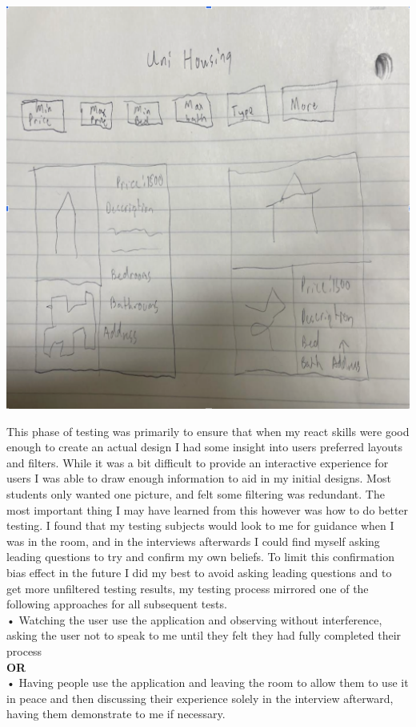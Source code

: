 \documentclass[10pt,twocolumn]{article}
\begin{document}
\centerline{\includegraphics[scale=.35]{Early User Test.png}}

This phase of testing was primarily to ensure that when my react skills were good enough to create an actual design I had some insight into users preferred layouts and filters. While it was a bit difficult to provide an interactive experience for users I was able to draw enough information to aid in my initial designs. Most students only wanted one picture, and felt some filtering was redundant. The most important thing I may have learned from this however was how to do better testing. I found that my testing subjects would look to me for guidance when I was in the room, and in the interviews afterwards I could find myself asking leading questions to try and confirm my own beliefs. To limit this confirmation bias effect in the future I did my best to avoid asking leading questions and to get more unfiltered testing results, my testing process mirrored one of the following approaches for all subsequent tests. \\

\noindent• Watching the user use the application and observing without interference, asking the user not to speak to me until they felt they had fully completed their process \\ 
\textbf{OR} \\
• Having people use the application and leaving the room to allow them to use it in peace and then discussing their experience solely in the interview afterward, having them demonstrate to me if necessary.  \\
\end{document}
